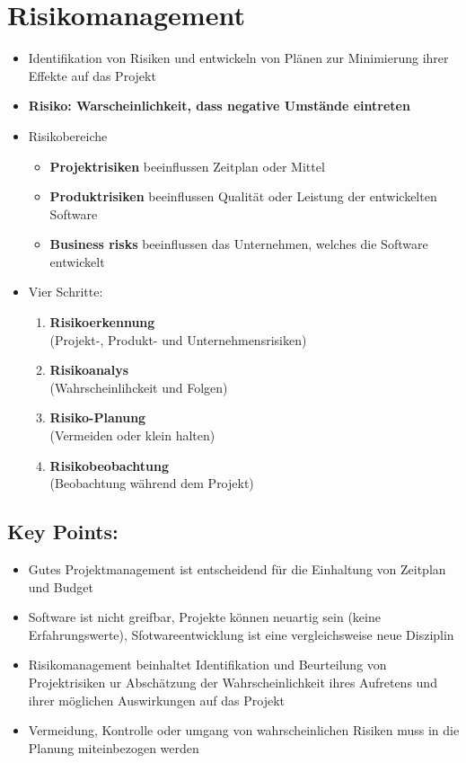 \section{Risikomanagement}
\begin{itemize}
    \item Identifikation von Risiken und entwickeln von Plänen zur Minimierung ihrer Effekte auf das Projekt 
    \item \textbf{Risiko: Warscheinlichkeit, dass negative Umstände eintreten}
    \item Risikobereiche
    \begin{itemize}
        \item \textbf{Projektrisiken} beeinflussen Zeitplan oder Mittel
        \item \textbf{Produktrisiken} beeinflussen Qualität oder Leistung der entwickelten Software 
        \item \textbf{Business risks} beeinflussen das Unternehmen, welches die Software entwickelt 
    \end{itemize}
    \item Vier Schritte:
    \begin{enumerate}
        \item \textbf{Risikoerkennung} \\
        (Projekt-, Produkt- und Unternehmensrisiken)
        \item \textbf{Risikoanalys}\\
        (Wahrscheinlihckeit und Folgen)
        \item \textbf{Risiko-Planung}\\
        (Vermeiden oder klein halten)
        \item \textbf{Risikobeobachtung}\\
        (Beobachtung während dem Projekt)
    \end{enumerate}
\end{itemize}

\subsection{Key Points:}
\begin{itemize}
    \item Gutes Projektmanagement ist entscheidend für die Einhaltung von Zeitplan und Budget
    \item Software ist nicht greifbar, Projekte können neuartig sein (keine Erfahrungswerte), Sfotwareentwicklung ist eine vergleichsweise neue Disziplin
    \item Risikomanagement beinhaltet Identifikation und Beurteilung von Projektrisiken ur Abschätzung der Wahrscheinlichkeit ihres Aufretens und ihrer möglichen Auswirkungen auf das Projekt 
    \item Vermeidung, Kontrolle oder umgang von wahrscheinlichen Risiken muss in die Planung miteinbezogen werden 
\end{itemize}

